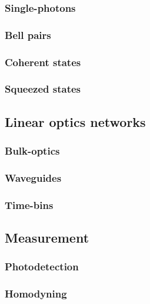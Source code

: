 \documentclass[aps,rmp,twocolumn,amsmath,amssymb,nofootinbib,superscriptaddress]{revtex4}
\newcommand{\comment}[1]{{\color{blue}{#1}}}
\begin{document}
\subsubsection{Single-photons}

\subsubsection{Bell pairs}

\subsubsection{Coherent states}

\subsubsection{Squeezed states}

\subsection{Linear optics networks}

\subsubsection{Bulk-optics}

\subsubsection{Waveguides}

\subsubsection{Time-bins}

\comment{Discuss fibre-loop architecture}

\subsection{Measurement}

\subsubsection{Photodetection}

\comment{Discuss number-resolved and bucket detectors, multiplexed detection, APDs, current micropillar detectors}

\subsubsection{Homodyning}
\end{document}

